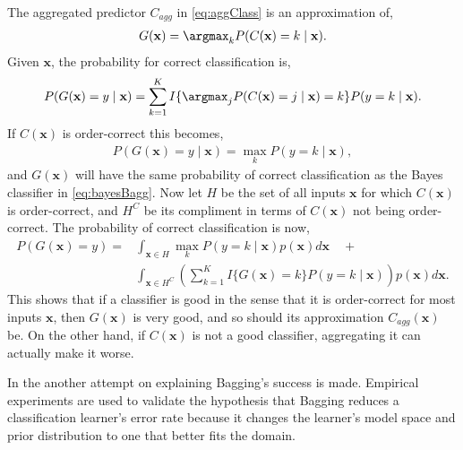 The aggregated predictor $C_{agg}$ in \eqref{eq:aggClass} is an approximation of, 
\begin{align}
  G(\mathbf{x}) = \argmax_k P(C(\mathbf{x})=k \mid \mathbf{x}).
\end{align}
Given $\mathbf{x}$, the probability for correct classification is,
\begin{align}
  P(G(\mathbf{x}) = y \mid \mathbf{x})  
  = \sum^{K}_{k=1} I\{ \argmax_j P(C(\mathbf{x}) = j \mid \mathbf{x}) = k \} P(y=k \mid \mathbf{x}).
\end{align}
If $C(\mathbf{x})$ is order-correct this becomes,
\begin{align}
  P(G(\mathbf{x}) = y \mid \mathbf{x})  = \max_k P(y = k \mid \mathbf{x}),
\end{align}
and $G(\mathbf{x})$ will have the same probability of correct classification as the Bayes classifier in  \eqref{eq:bayesBagg}. Now let $H$ be the set of all inputs $\mathbf{x}$ for which $C(\mathbf{x})$ is order-correct, and $H^C$ be its compliment in terms of $C(\mathbf{x})$ not being order-correct. The probability of correct classification is now,
\begin{align}
  P(G(\mathbf{x}) = y) = &\int_{\mathbf{x} \in H} \max_k P(y=k \mid \mathbf{x})  p(\mathbf{x}) d\mathbf{x} \quad + \\
  &\int_{\mathbf{x} \in H^C} \left(\sum^{K}_{k=1} I\{ G(\mathbf{x}) = k \} P(y=k \mid \mathbf{x})   \right) p(\mathbf{x}) d\mathbf{x}.
\end{align}
This shows that if a classifier is good in the sense that it is order-correct for most inputs $\mathbf{x}$, then $G(\mathbf{x})$ is very good, and so should its approximation $C_{agg}(\mathbf{x})$ be. On the other hand, if $C(\mathbf{x})$ is not a good classifier, aggregating it can actually make it worse.

In \cite{domingos1997Bagging} the another attempt on explaining Bagging's success is made. Empirical experiments are used to validate the hypothesis that Bagging reduces a classification learner's error rate because it changes the learner's model space and prior distribution to one that better fits the domain. 


